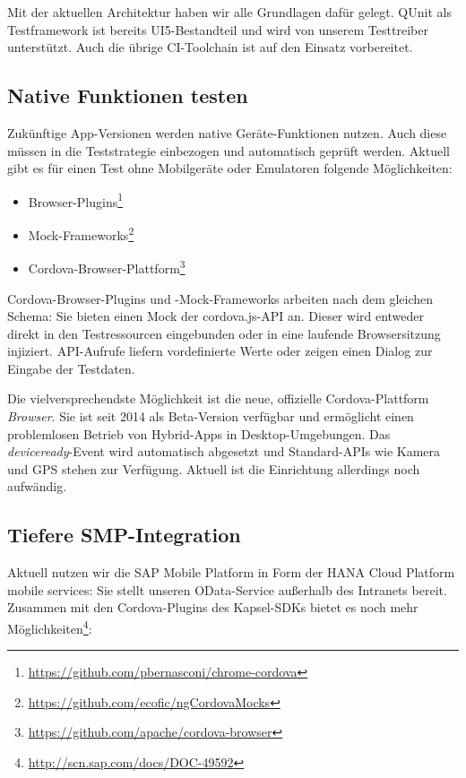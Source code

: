 Mit der aktuellen Architektur haben wir alle Grundlagen dafür gelegt. QUnit als Testframework ist bereits UI5-Bestandteil und wird von unserem Testtreiber unterstützt. Auch die übrige CI-Toolchain ist auf den Einsatz vorbereitet.
%

\subsection{Native Funktionen testen}
Zukünftige App-Versionen werden native Geräte-Funktionen nutzen. Auch diese müssen in die Teststrategie einbezogen und automatisch geprüft werden. Aktuell gibt es für einen Test ohne Mobilgeräte oder Emulatoren folgende Möglichkeiten:

\begin{itemize}
	\item Browser-Plugins\footnote{\url{https://github.com/pbernasconi/chrome-cordova}}
	\item Mock-Frameworks\footnote{\url{https://github.com/ecofic/ngCordovaMocks}}
	\item Cordova-Browser-Plattform\footnote{\url{https://github.com/apache/cordova-browser}}
\end{itemize}
Cordova-Browser-Plugins und -Mock-Frameworks arbeiten nach dem gleichen Schema: Sie bieten einen Mock der cordova.js-API an. Dieser wird entweder direkt in den Testressourcen eingebunden oder in eine laufende Browsersitzung injiziert. API-Aufrufe liefern vordefinierte Werte oder zeigen einen Dialog zur Eingabe der Testdaten.

Die vielversprechendste Möglichkeit ist die neue, offizielle Cordova-Platt\-form \textit{Browser}. Sie ist seit 2014 als Beta-Version verfügbar und ermöglicht einen problemlosen Betrieb von Hybrid-Apps in Desktop-Umgebungen. Das \textit{deviceready}-Event wird automatisch abgesetzt und Standard-APIs wie Kamera und GPS stehen zur Verfügung. Aktuell ist die Einrichtung allerdings noch aufwändig.

\subsection{Tiefere SMP-Integration}
Aktuell nutzen wir die SAP Mobile Platform in Form der HANA Cloud Platform mobile services: Sie stellt unseren OData-Service außerhalb des Intranets bereit. Zusammen mit den Cordova-Plugins des Kapsel-SDKs bietet es noch mehr Möglichkeiten\footnote{\url{http://scn.sap.com/docs/DOC-49592}}:

